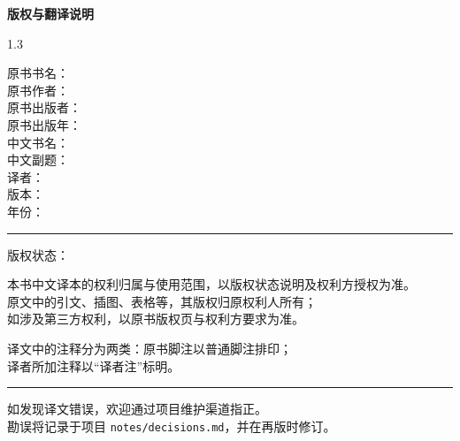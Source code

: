 \vspace*{\fill}
\begin{center}
{\sffamily\bfseries 版权与翻译说明}
\end{center}
\vspace{1.5em}

{\small
\begin{spacing}{1.3}
\begin{flushleft}

原书书名：\textit{\booktitleoriginal}\\
原书作者：\bookauthororiginal\\
原书出版者：\bookoriginalpublisher\\
原书出版年：\bookoriginalyear\\
中文书名：\booktitle\\
中文副题：\booksubtitle\\
译者：\booktranslator\\
版本：\bookversion\\
年份：\bookyear

\vspace{1.2em}
\hrule
\vspace{1.2em}

版权状态：\bookrights

\vspace{0.8em}
本书中文译本的权利归属与使用范围，以版权状态说明及权利方授权为准。\\
原文中的引文、插图、表格等，其版权归原权利人所有；\\
如涉及第三方权利，以原书版权页与权利方要求为准。

\vspace{0.8em}
译文中的注释分为两类：原书脚注以普通脚注排印；\\
译者所加注释以“译者注”标明。

\vspace{1.2em}
\hrule
\vspace{1.2em}

如发现译文错误，欢迎通过项目维护渠道指正。\\
勘误将记录于项目 \texttt{notes/decisions.md}，并在再版时修订。

\end{flushleft}
\end{spacing}
}

\vspace*{\fill}
